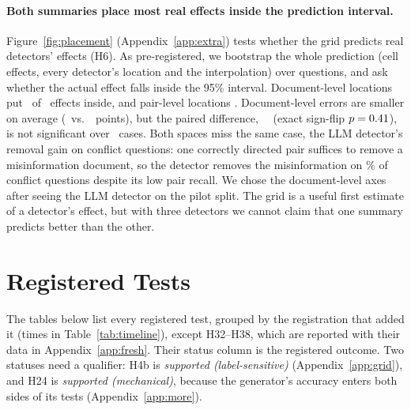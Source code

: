 \paragraph{Both summaries place most real effects inside the prediction interval.}
Figure~\ref{fig:placement} (Appendix~\ref{app:extra}) tests
whether the grid predicts real detectors' effects (H6). As pre-registered, we bootstrap the whole prediction (cell effects, every detector's
location and the interpolation) over questions, and ask whether the actual effect falls inside the 95\% interval.
Document-level locations put \hSixDocIn\ of \hSixN\ effects inside, and pair-level locations
\hSixPairIn. Document-level errors are smaller on
average (\hSixDocMae\ vs.\ \hSixPairMae\ points), but the paired difference, \hSixMaeDiff\ \hSixMaeDiffCI\ (exact
sign-flip $p=0.41$), is not significant over \hSixN\ cases. Both spaces miss the same case, the LLM detector's
removal gain on conflict questions: one correctly directed pair suffices to remove a misinformation document, so the
detector removes the misinformation on \misGoneLlm\% of conflict questions despite its low pair recall. We chose the
document-level axes after seeing the LLM detector on the pilot split. The grid is a useful first estimate of a
detector's effect, but with three detectors we cannot claim that one summary predicts better than the other.

\section{Registered Tests}
\label{app:hyp}
The tables below list every registered test, grouped by the registration that added it (times in
Table~\ref{tab:timeline}), except H32--H38, which are reported with their data in Appendix~\ref{app:fresh}. Their status column is the registered outcome. Two statuses need a qualifier: H4b is
\emph{supported (label-sensitive)} (Appendix~\ref{app:grid}), and H24 is \emph{supported (mechanical)}, because the
generator's accuracy enters both sides of its tests (Appendix~\ref{app:more}).

